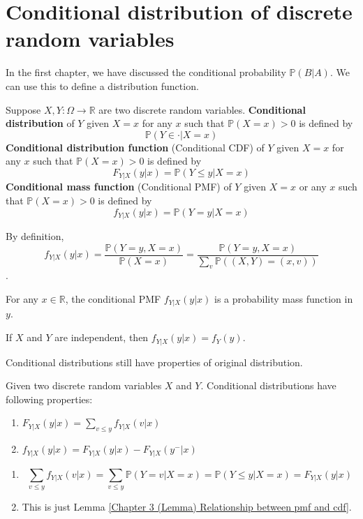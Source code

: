 \documentclass{huhtakm-template-book}
\newcommand{\prob}{\mathbb{P}}
\begin{document}
\section{Conditional distribution of discrete random variables}
In the first chapter, we have discussed the conditional probability $\prob(B|A)$. We can use this to define a distribution function.
\begin{defn}
	Suppose $X,Y:\Omega\to\mathbb{R}$ are two discrete random variables. \textbf{Conditional distribution} of $Y$ given $X=x$ for any $x$ such that $\prob(X=x)>0$ is defined by
	\begin{equation*}
		\prob(Y\in \cdot|X=x)
	\end{equation*}
	\textbf{Conditional distribution function} (Conditional CDF) of $Y$ given $X=x$ for any $x$ such that $\prob(X=x)>0$ is defined by
	\begin{equation*}
		F_{Y|X}(y|x)=\prob(Y\leq y|X=x)
	\end{equation*}
	\textbf{Conditional mass function} (Conditional PMF) of $Y$ given $X=x$ or any $x$ such that $\prob(X=x)>0$ is defined by
	\begin{equation*}
		f_{Y|X}(y|x)=\prob(Y=y|X=x)
	\end{equation*}
\end{defn}
\begin{rem}
	By definition, 
	\begin{equation*}
		f_{Y|X}(y|x)=\frac{\prob(Y=y,X=x)}{\prob(X=x)}=\frac{\prob(Y=y,X=x)}{\sum_{v}\prob((X,Y)=(x,v))}
	\end{equation*}.
\end{rem}
\begin{rem}
	For any $x\in\mathbb{R}$, the conditional PMF $f_{Y|X}(y|x)$ is a probability mass function in $y$.
\end{rem}
\begin{rem}
	If $X$ and $Y$ are independent, then $f_{Y|X}(y|x)=f_{Y}(y)$.
\end{rem}
Conditional distributions still have properties of original distribution.
\begin{lem}
	Given two discrete random variables $X$ and $Y$. Conditional distributions have following properties:
	\begin{enumerate}
		\item $F_{Y|X}(y|x)=\sum_{v\leq y}f_{Y|X}(v|x)$
		\item $f_{Y|X}(y|x)=F_{Y|X}(y|x)-F_{Y|X}(y^{-}|x)$
	\end{enumerate}
\end{lem}
\begin{proofing}
	\begin{enumerate}
		\item 
		\begin{equation*}
			\sum_{v\leq y}f_{Y|X}(v|x)=\sum_{v\leq y}\prob(Y=v|X=x)=\prob(Y\leq y|X=x)=F_{Y|X}(y|x)
		\end{equation*}
		\item 
		This is just Lemma \ref{Chapter 3 (Lemma) Relationship between pmf and cdf}.
	\end{enumerate}
\end{proofing}
\end{document}
